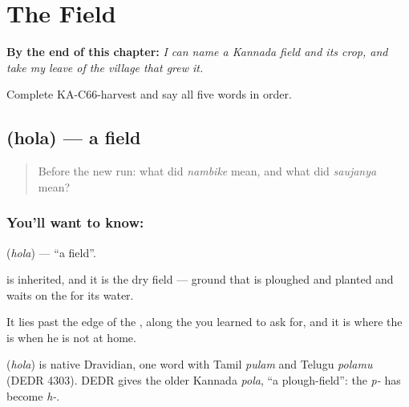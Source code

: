
\chapter{The Field}
\label{ch:ka-field}

\begin{chapteropening}
\textbf{By the end of this chapter:} \emph{I can name a Kannada field and its crop, and take my leave of the village that grew it.}

Complete KA-C66-harvest and say all five words in order.
\end{chapteropening}

\section[\texorpdfstring{\kn{ಹೊಲ} (hola)}{ಹೊಲ (hola)}]{ (hola) — a field}

\label{lesson:KA-C66-field}



\begin{quote}
Before the new run: what did \emph{nambike} mean, and what did \emph{saujanya} mean?
\end{quote}

\subsection*{You'll want to know: }
\textbf{} (\emph{hola}) — \textquotedblleft{}a field\textquotedblright{}.

 is inherited, and it is the dry field — ground that is ploughed and planted and waits on the  for its water.

It lies past the edge of the , along the  you learned to ask for, and it is where the  is when he is not at home.

\begin{cousinweb}
\textbf{} (\emph{hola}) is native Dravidian, one word with Tamil \emph{pulam} and Telugu \emph{polamu} (DEDR 4303). DEDR gives the older Kannada \emph{pola}, \textquotedblleft{}a plough-field\textquotedblright{}: the \emph{p-} has become \emph{h-}.
\end{cousinweb}

